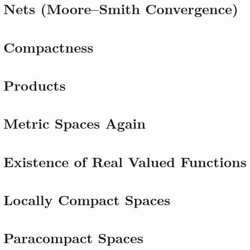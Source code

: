 \section{Nets (Moore--Smith Convergence)}





\section{Compactness}




\section{Products}
\addtocounter{subsection}{1}

\addtocounter{subsection}{-2}

\addtocounter{subsection}{1}








\section{Metric Spaces Again}






\section{Existence of Real Valued Functions}



\section{Locally Compact Spaces}




\section{Paracompact Spaces}


